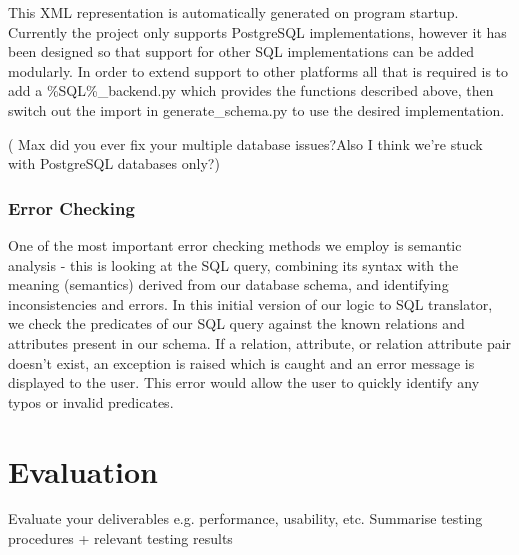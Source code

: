 \documentclass[a4paper, 11pt]{article}
\begin{document}
      This XML representation is automatically generated on program startup. 
      Currently the project only supports PostgreSQL implementations, however it 
      has been designed so that support for other SQL implementations can be 
      added modularly. In order to extend support to other platforms all that is  
      required is to add a \%SQL\%\_backend.py which provides the functions
      described above, then switch out the import in generate\_schema.py to use
      the desired implementation.


      ( Max did you ever fix your multiple database issues?Also I think we're
      stuck with PostgreSQL databases only?) 

      \subsubsection{Error Checking}


      One of the most important error checking methods we employ is semantic
      analysis - this is looking at the SQL query, combining its syntax with
      the meaning (semantics) derived from our database schema, and identifying
      inconsistencies and errors. In this initial version of our logic to SQL
      translator, we check the predicates of our SQL query against the known
      relations and attributes present in our schema. If a relation, attribute,
      or relation attribute pair doesn't exist, an exception is raised which is
      caught and an error message is displayed to the user. This error would
      allow the user to quickly identify any typos or invalid predicates.


\section{Evaluation}
  Evaluate your deliverables e.g. performance, usability, etc.
  Summarise testing procedures + relevant testing results
\end{document}

